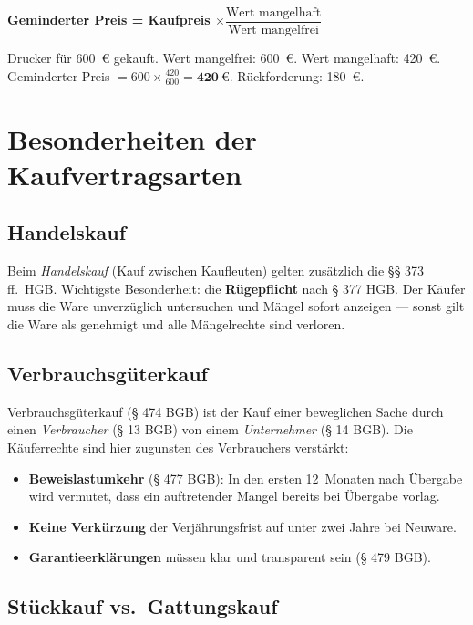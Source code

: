 \documentclass[11pt, a4paper]{article}
\begin{document}
\begin{merksatz}[title={Formel nach § 441 Abs. 3 BGB}]
\textbf{Geminderter Preis = Kaufpreis $\times \dfrac{\text{Wert mangelhaft}}{\text{Wert mangelfrei}}$}
\end{merksatz}

\begin{beispiel}
Drucker für 600~€ gekauft. Wert mangelfrei: 600~€. Wert mangelhaft: 420~€.
Geminderter Preis $= 600 \times \frac{420}{600} = \mathbf{420~€}$. Rückforderung: 180~€.
\end{beispiel}

\section{Besonderheiten der Kaufvertragsarten}

\subsection{Handelskauf}

Beim \emph{Handelskauf} (Kauf zwischen Kaufleuten) gelten zusätzlich die §§ 373 ff.\ HGB.
Wichtigste Besonderheit: die \textbf{Rügepflicht} nach § 377 HGB. Der Käufer muss die
Ware unverzüglich untersuchen und Mängel sofort anzeigen --- sonst gilt die Ware als
genehmigt und alle Mängelrechte sind verloren.

\subsection{Verbrauchsgüterkauf}

Verbrauchsgüterkauf (§ 474 BGB) ist der Kauf einer beweglichen Sache durch einen
\emph{Verbraucher} (§ 13 BGB) von einem \emph{Unternehmer} (§ 14 BGB). Die
Käuferrechte sind hier zugunsten des Verbrauchers verstärkt:

\begin{itemize}[itemsep=2pt]
  \item \textbf{Beweislastumkehr} (§ 477 BGB): In den ersten 12~Monaten nach Übergabe wird vermutet, dass ein auftretender Mangel bereits bei Übergabe vorlag.
  \item \textbf{Keine Verkürzung} der Verjährungsfrist auf unter zwei Jahre bei Neuware.
  \item \textbf{Garantieerklärungen} müssen klar und transparent sein (§ 479 BGB).
\end{itemize}

\subsection{Stückkauf vs.\ Gattungskauf}
\end{document}
